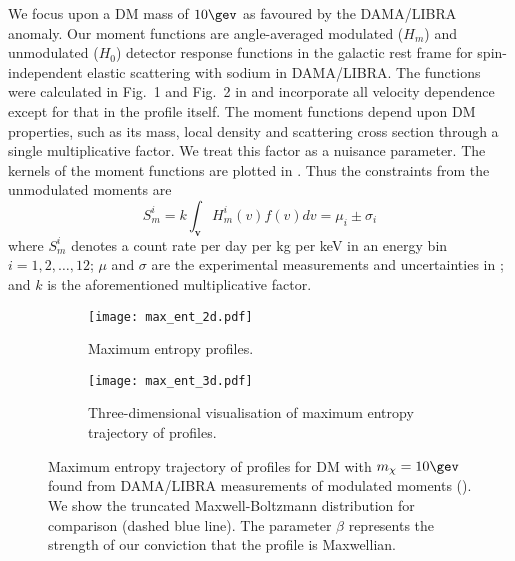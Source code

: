 \documentclass{article}
\begin{document}
We focus upon a DM mass of $10\gev$ as favoured by the DAMA/LIBRA anomaly. Our moment functions are angle-averaged modulated ($H_m$) and unmodulated ($H_0$)  detector response functions in the galactic rest frame for spin-independent elastic scattering with sodium in DAMA/LIBRA. The functions were calculated in Fig.~1 and Fig.~2 in  and incorporate all velocity dependence except for that in the profile itself. The moment functions depend upon DM properties, such as its mass, local density and scattering cross section through a single multiplicative factor. We treat this factor as a nuisance parameter. The kernels of the moment functions are plotted in . Thus the constraints from the unmodulated moments are
\begin{equation}
S_m^i = k \int_{\mathbf v} H_m^i(v) f(v) dv = \mu_i \pm \sigma_i
\end{equation}
where $S_m^i$ denotes a count rate per day per kg per keV in an energy bin $i = 1, 2, \ldots, 12$; $\mu$ and $\sigma$ are the experimental measurements and uncertainties in ; and $k$ is the aforementioned multiplicative factor.

\begin{figure}
    \centering
    \begin{subfigure}[t]{0.49\textwidth}
        \centering
        \texttt{[image: max\_ent\_2d.pdf]}
        \caption{Maximum entropy profiles.}
        \label{fig:max_ent_2d}
    \end{subfigure}
    \begin{subfigure}[t]{0.49\textwidth}
        \centering
        \texttt{[image: max\_ent\_3d.pdf]}
        \caption{Three-dimensional visualisation of maximum entropy trajectory of profiles.}
        \label{fig:max_ent_3d}
    \end{subfigure}
    
    \caption{Maximum entropy trajectory of profiles for DM with $m_\chi = 10\gev$ found from DAMA/LIBRA measurements of modulated moments (). We show the truncated Maxwell-Boltzmann distribution for comparison (dashed blue line). The parameter $\beta$ represents the strength of our conviction that the profile is Maxwellian.}
    \label{fig:max_ent}
\end{figure}
\end{document}
